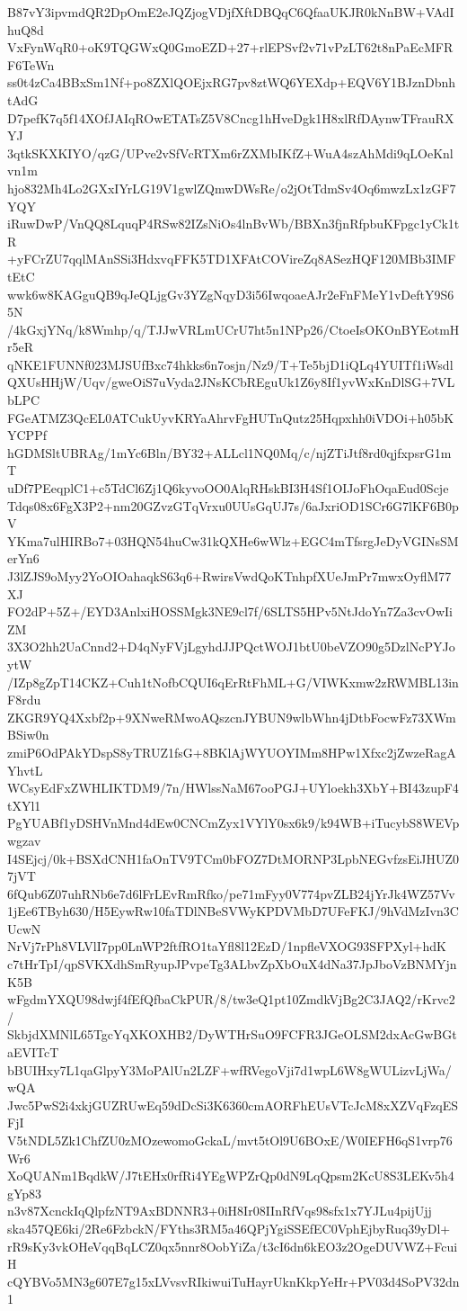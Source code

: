 B87vY3ipvmdQR2DpOmE2eJQZjogVDjfXftDBQqC6QfaaUKJR0kNnBW+VAdIhuQ8d
VxFynWqR0+oK9TQGWxQ0GmoEZD+27+rlEPSvf2v71vPzLT62t8nPaEcMFRF6TeWn
ss0t4zCa4BBxSm1Nf+po8ZXlQOEjxRG7pv8ztWQ6YEXdp+EQV6Y1BJznDbnhtAdG
D7pefK7q5f14XOfJAIqROwETATsZ5V8Cncg1hHveDgk1H8xlRfDAynwTFrauRXYJ
3qtkSKXKIYO/qzG/UPve2vSfVcRTXm6rZXMbIKfZ+WuA4szAhMdi9qLOeKnlvn1m
hjo832Mh4Lo2GXxIYrLG19V1gwlZQmwDWsRe/o2jOtTdmSv4Oq6mwzLx1zGF7YQY
iRuwDwP/VnQQ8LquqP4RSw82IZsNiOs4lnBvWb/BBXn3fjnRfpbuKFpgc1yCk1tR
+yFCrZU7qqlMAnSSi3HdxvqFFK5TD1XFAtCOVireZq8ASezHQF120MBb3IMFtEtC
wwk6w8KAGguQB9qJeQLjgGv3YZgNqyD3i56IwqoaeAJr2eFnFMeY1vDeftY9S65N
/4kGxjYNq/k8Wmhp/q/TJJwVRLmUCrU7ht5n1NPp26/CtoeIsOKOnBYEotmHr5eR
qNKE1FUNNf023MJSUfBxc74hkks6n7osjn/Nz9/T+Te5bjD1iQLq4YUITf1iWsdl
QXUsHHjW/Uqv/gweOiS7uVyda2JNsKCbREguUk1Z6y8If1yvWxKnDlSG+7VLbLPC
FGeATMZ3QcEL0ATCukUyvKRYaAhrvFgHUTnQutz25Hqpxhh0iVDOi+h05bKYCPPf
hGDMSltUBRAg/1mYc6Bln/BY32+ALLcl1NQ0Mq/c/njZTiJtf8rd0qjfxpsrG1mT
uDf7PEeqplC1+c5TdCl6Zj1Q6kyvoOO0AlqRHskBI3H4Sf1OIJoFhOqaEud0Scje
Tdqs08x6FgX3P2+nm20GZvzGTqVrxu0UUsGqUJ7s/6aJxriOD1SCr6G7lKF6B0pV
YKma7ulHIRBo7+03HQN54huCw31kQXHe6wWlz+EGC4mTfsrgJeDyVGINsSMerYn6
J3lZJS9oMyy2YoOIOahaqkS63q6+RwirsVwdQoKTnhpfXUeJmPr7mwxOyflM77XJ
FO2dP+5Z+/EYD3AnlxiHOSSMgk3NE9cl7f/6SLTS5HPv5NtJdoYn7Za3cvOwIiZM
3X3O2hh2UaCnnd2+D4qNyFVjLgyhdJJPQctWOJ1btU0beVZO90g5DzlNcPYJoytW
/IZp8gZpT14CKZ+Cuh1tNofbCQUI6qErRtFhML+G/VIWKxmw2zRWMBL13inF8rdu
ZKGR9YQ4Xxbf2p+9XNweRMwoAQszcnJYBUN9wlbWhn4jDtbFocwFz73XWmBSiw0n
zmiP6OdPAkYDspS8yTRUZ1fsG+8BKlAjWYUOYIMm8HPw1Xfxc2jZwzeRagAYhvtL
WCsyEdFxZWHLIKTDM9/7n/HWlssNaM67ooPGJ+UYloekh3XbY+BI43zupF4tXYl1
PgYUABf1yDSHVnMnd4dEw0CNCmZyx1VYlY0sx6k9/k94WB+iTucybS8WEVpwgzav
I4SEjcj/0k+BSXdCNH1faOnTV9TCm0bFOZ7DtMORNP3LpbNEGvfzsEiJHUZ07jVT
6fQub6Z07uhRNb6e7d6lFrLEvRmRfko/pe71mFyy0V774pvZLB24jYrJk4WZ57Vv
1jEe6TByh630/H5EywRw10faTDlNBeSVWyKPDVMbD7UFeFKJ/9hVdMzIvn3CUcwN
NrVj7rPh8VLVlI7pp0LnWP2ftfRO1taYfl8l12EzD/1npfleVXOG93SFPXyl+hdK
c7tHrTpI/qpSVKXdhSmRyupJPvpeTg3ALbvZpXbOuX4dNa37JpJboVzBNMYjnK5B
wFgdmYXQU98dwjf4fEfQfbaCkPUR/8/tw3eQ1pt10ZmdkVjBg2C3JAQ2/rKrvc2/
SkbjdXMNlL65TgcYqXKOXHB2/DyWTHrSuO9FCFR3JGeOLSM2dxAcGwBGtaEVITcT
bBUIHxy7L1qaGlpyY3MoPAlUn2LZF+wfRVegoVji7d1wpL6W8gWULizvLjWa/wQA
Jwc5PwS2i4xkjGUZRUwEq59dDcSi3K6360cmAORFhEUsVTcJcM8xXZVqFzqESFjI
V5tNDL5Zk1ChfZU0zMOzewomoGckaL/mvt5tOl9U6BOxE/W0IEFH6qS1vrp76Wr6
XoQUANm1BqdkW/J7tEHx0rfRi4YEgWPZrQp0dN9LqQpsm2KcU8S3LEKv5h4gYp83
n3v87XcnckIqQlpfzNT9AxBDNNR3+0iH8Ir08IInRfVqs98sfx1x7YJLu4pijUjj
ska457QE6ki/2Re6FzbckN/FYths3RM5a46QPjYgiSSEfEC0VphEjbyRuq39yDl+
rR9sKy3vkOHeVqqBqLCZ0qx5nnr8OobYiZa/t3cI6dn6kEO3z2OgeDUVWZ+FcuiH
cQYBVo5MN3g607E7g15xLVvsvRIkiwuiTuHayrUknKkpYeHr+PV03d4SoPV32dn1
